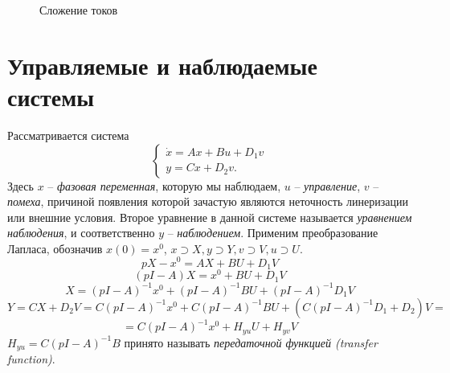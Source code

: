 \begin{figure}[h]
	\caption{Сложение токов}
	\label{ch14plus}

\end{figure}

\section{Управляемые и наблюдаемые системы}
Рассматривается система
\begin{equation}\label{ch14cont1}
\begin{cases}
\dot x = Ax + Bu + D_1v \\
y = Cx + D_2v.
\end{cases}
\end{equation}
Здесь $x$ -- \textit{фазовая переменная}, которую мы наблюдаем, $u$ -- \textit{управление}, $v$ -- \textit{помеха}, причиной появления которой зачастую являются неточность линеризации или внешние условия. Второе уравнение в данной системе называется \textit{уравнением наблюдения}, и соответственно $y$ -- \textit{наблюдением}. Применим преобразование Лапласа, обозначив $x(0) =x^0$, $x \supset X, y \supset Y, v \supset V, u \supset U$.
$$ pX - x^0 = AX + BU +  D_1V$$
$$ (pI - A)X = x^0 + BU + D_1V$$
$$ X = (pI - A)^{-1} x^0 +(pI - A)^{-1}BU + (pI - A)^{-1}D_1V $$
$$ Y = CX + D_2V = C(pI - A)^{-1}x^0 + C(pI - A)^{-1}BU + (C(pI - A)^{-1}D_1 + D_2)V =$$
$$ = C(pI - A)^{-1}x^0 + H_{yu}U + H_{yv}V$$
$H_{yu}   = C(pI - A)^{-1}B$ принято называть \textit{передаточной функцией (transfer function)}.

